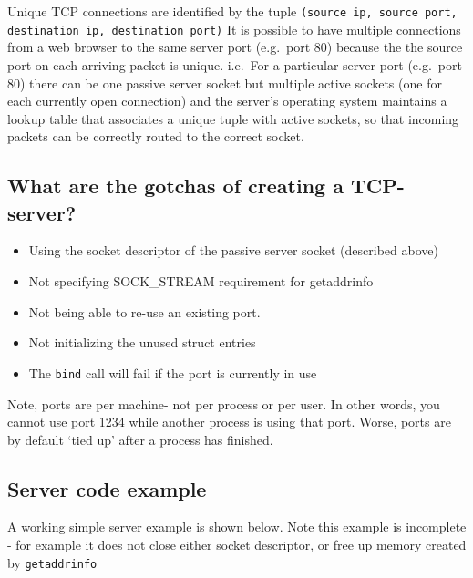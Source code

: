 Unique TCP connections are identified by the tuple \texttt{(source ip, source port, destination ip, destination port)} It is possible to have multiple connections from a web browser to the same server port (e.g.~port 80) because the the source port on each arriving packet is unique. i.e.~For a particular server port (e.g.~port 80) there can be one passive server socket but multiple active sockets (one for each currently open connection) and the server's operating system maintains a lookup table that associates a unique tuple with active sockets, so that incoming packets can be correctly routed to the correct socket.

\subsection{What are the gotchas of creating a TCP-server?}\label{what-are-the-gotchas-of-creating-a-tcp-server}

\begin{itemize}
\tightlist
\item
  Using the socket descriptor of the passive server socket (described above)
\item
  Not specifying SOCK\_STREAM requirement for getaddrinfo
\item
  Not being able to re-use an existing port.
\item
  Not initializing the unused struct entries
\item
  The \texttt{bind} call will fail if the port is currently in use
\end{itemize}

Note, ports are per machine- not per process or per user. In other words, you cannot use port 1234 while another process is using that port. Worse, ports are by default `tied up' after a process has finished.

\subsection{Server code example}\label{server-code-example}

A working simple server example is shown below. Note this example is incomplete - for example it does not close either socket descriptor, or free up memory created by \texttt{getaddrinfo}

